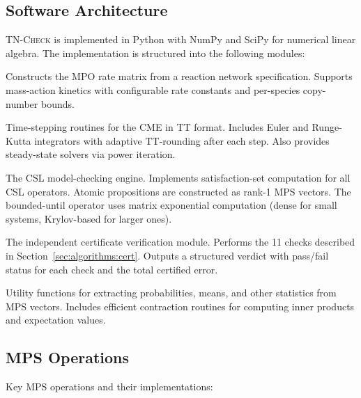 \documentclass[11pt]{article}
\newcommand{\tncheck}{\textsc{TN-Check}}
\begin{document}
\subsection{Software Architecture}

\tncheck{} is implemented in Python with NumPy and SciPy for
numerical linear algebra.
The implementation is structured into the following modules:

\begin{description}[leftmargin=1em,itemsep=2pt]
\item[\texttt{generator/}]
  Constructs the MPO rate matrix from a reaction network specification.
  Supports mass-action kinetics with configurable rate constants
  and per-species copy-number bounds.

\item[\texttt{solver/}]
  Time-stepping routines for the CME in TT format.
  Includes Euler and Runge-Kutta integrators with adaptive
  TT-rounding after each step.
  Also provides steady-state solvers via power iteration.

\item[\texttt{verifier/}]
  The CSL model-checking engine.
  Implements satisfaction-set computation for all CSL operators.
  Atomic propositions are constructed as rank-1 MPS vectors.
  The bounded-until operator uses matrix exponential computation
  (dense for small systems, Krylov-based for larger ones).

\item[\texttt{certificate/}]
  The independent certificate verification module.
  Performs the 11 checks described in Section~\ref{sec:algorithms:cert}.
  Outputs a structured verdict with pass/fail status for each check
  and the total certified error.

\item[\texttt{evaluator/}]
  Utility functions for extracting probabilities, means, and
  other statistics from MPS vectors.
  Includes efficient contraction routines for computing inner
  products and expectation values.
\end{description}

\subsection{MPS Operations}

Key MPS operations and their implementations:
\end{document}
